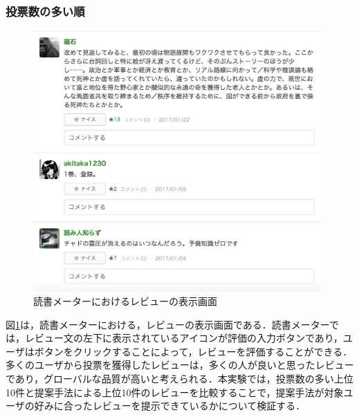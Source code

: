 \documentclass[a4paper,11pt,oneside,openany]{jsbook}
\begin{document}
\subsubsection{投票数の多い順}
\begin{figure}[tb]
	\begin{center} %
		\includegraphics [width = 110mm] {figures/bookmeter_vote.png} %
	\end{center}
	\caption{読書メーターにおけるレビューの表示画面} %
	\label{fig:vote} %
\end{figure}
図\ref{fig:vote}は，読書メーターにおける，レビューの表示画面である．読書メーターでは，レビュー文の左下に表示されているアイコンが評価の入力ボタンであり，ユーザはボタンをクリックすることによって，レビューを評価することができる．多くのユーザから投票を獲得したレビューは，多くの人が良いと思ったレビューであり，グローバルな品質が高いと考えられる．本実験では，投票数の多い上位10件と提案手法による上位10件のレビューを比較することで，提案手法が対象ユーザの好みに合ったレビューを提示できているかについて検証する．
\end{document}
